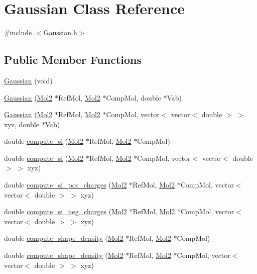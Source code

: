 \hypertarget{classGaussian}{
\section{Gaussian Class Reference}
\label{classGaussian}
}


{\ttfamily \#include $<$Gaussian.h$>$}

\subsection*{Public Member Functions}
\begin{DoxyCompactItemize}
\item 
\hyperlink{classGaussian_a877a470591c41d248bdb4356c1c14370}{Gaussian} (void)
\item 
\hyperlink{classGaussian_a62de70c599d1558b705e39ef9f176f3c}{Gaussian} (\hyperlink{classMol2}{Mol2} $\ast$RefMol, \hyperlink{classMol2}{Mol2} $\ast$CompMol, double $\ast$Vab)
\item 
\hyperlink{classGaussian_a469209c4c984a0118d3f4a6efc693d05}{Gaussian} (\hyperlink{classMol2}{Mol2} $\ast$RefMol, \hyperlink{classMol2}{Mol2} $\ast$CompMol, vector$<$ vector$<$ double $>$ $>$ xyz, double $\ast$Vab)
\item 
double \hyperlink{classGaussian_aa42c109a39b13f847009947a77cd06b0}{compute\_\-si} (\hyperlink{classMol2}{Mol2} $\ast$RefMol, \hyperlink{classMol2}{Mol2} $\ast$CompMol)
\item 
double \hyperlink{classGaussian_ac8b23b3c00889eb1f38da472f9b67fb6}{compute\_\-si} (\hyperlink{classMol2}{Mol2} $\ast$RefMol, \hyperlink{classMol2}{Mol2} $\ast$CompMol, vector$<$ vector$<$ double $>$ $>$ xyz)
\item 
double \hyperlink{classGaussian_aab2b48b953d268cfb0e1041e9ae8ffef}{compute\_\-si\_\-pos\_\-charges} (\hyperlink{classMol2}{Mol2} $\ast$RefMol, \hyperlink{classMol2}{Mol2} $\ast$CompMol, vector$<$ vector$<$ double $>$ $>$ xyz)
\item 
double \hyperlink{classGaussian_adb4d179d7a65b8ecf34181be75a3ee93}{compute\_\-si\_\-neg\_\-charges} (\hyperlink{classMol2}{Mol2} $\ast$RefMol, \hyperlink{classMol2}{Mol2} $\ast$CompMol, vector$<$ vector$<$ double $>$ $>$ xyz)
\item 
double \hyperlink{classGaussian_a3fd619ab0bd48e3c46537194411de25e}{compute\_\-shape\_\-density} (\hyperlink{classMol2}{Mol2} $\ast$RefMol, \hyperlink{classMol2}{Mol2} $\ast$CompMol)
\item 
double \hyperlink{classGaussian_a61cf17d52f0efe6f8b5933023056d6c9}{compute\_\-shape\_\-density} (\hyperlink{classMol2}{Mol2} $\ast$RefMol, \hyperlink{classMol2}{Mol2} $\ast$CompMol, vector$<$ vector$<$ double $>$ $>$ xyz)

\end{DoxyCompactItemize}
